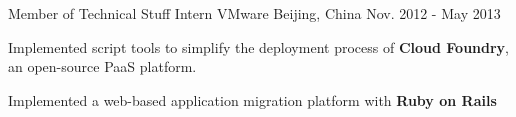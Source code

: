 \begin{cventries}
  \cventry
    {Member of Technical Stuff Intern} %
    {VMware} %
    {Beijing, China} %
    {Nov. 2012 - May 2013} %
    {
      \begin{cvitems}
        \item {Implemented script tools to simplify the deployment process of \textbf{Cloud Foundry}, an open-source PaaS platform.}
        \item {Implemented a web-based application migration platform with \textbf{Ruby on Rails}}
      \end{cvitems}
    }

\end{cventries}

